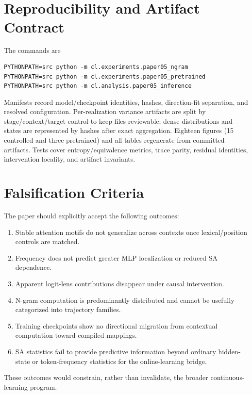 \documentclass[10pt]{article}
\begin{document}
\section{Reproducibility and Artifact Contract}
The commands are
\begin{verbatim}
PYTHONPATH=src python -m cl.experiments.paper05_ngram
PYTHONPATH=src python -m cl.experiments.paper05_pretrained
PYTHONPATH=src python -m cl.analysis.paper05_inference
\end{verbatim}
Manifests record model/checkpoint identities, hashes, direction-fit separation, and resolved configuration. Per-realization variance artifacts are split by stage/context/target control to keep files reviewable; dense distributions and states are represented by hashes after exact aggregation. Eighteen figures (15 controlled and three pretrained) and all tables regenerate from committed artifacts. Tests cover entropy/equivalence metrics, trace parity, residual identities, intervention locality, and artifact invariants.

\section{Falsification Criteria}
The paper should explicitly accept the following outcomes:
\begin{enumerate}
    \item Stable attention motifs do not generalize across contexts once lexical/position controls are matched.
    \item Frequency does not predict greater MLP localization or reduced SA dependence.
    \item Apparent logit-lens contributions disappear under causal intervention.
    \item N-gram computation is predominantly distributed and cannot be usefully categorized into trajectory families.
    \item Training checkpoints show no directional migration from contextual computation toward compiled mappings.
    \item SA statistics fail to provide predictive information beyond ordinary hidden-state or token-frequency statistics for the online-learning bridge.
\end{enumerate}
These outcomes would constrain, rather than invalidate, the broader continuous-learning program.
\end{document}
